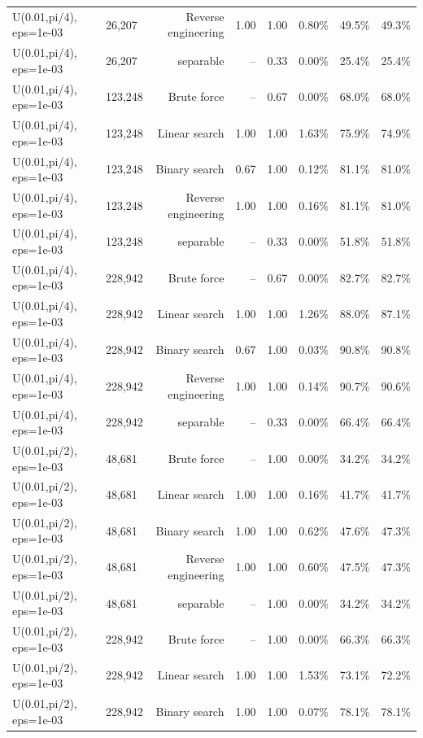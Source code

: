 \begin{tabular}{llrrrrrr}
U(0.01,pi/4), eps=1e-03 & 26,207 & Reverse engineering & 1.00 & 1.00 & 0.80\% & 49.5\% & 49.3\% \\
U(0.01,pi/4), eps=1e-03 & 26,207 & separable & -- & 0.33 & 0.00\% & 25.4\% & 25.4\% \\
U(0.01,pi/4), eps=1e-03 & 123,248 & Brute force & -- & 0.67 & 0.00\% & 68.0\% & 68.0\% \\
U(0.01,pi/4), eps=1e-03 & 123,248 & Linear search & 1.00 & 1.00 & 1.63\% & 75.9\% & 74.9\% \\
U(0.01,pi/4), eps=1e-03 & 123,248 & Binary search & 0.67 & 1.00 & 0.12\% & 81.1\% & 81.0\% \\
U(0.01,pi/4), eps=1e-03 & 123,248 & Reverse engineering & 1.00 & 1.00 & 0.16\% & 81.1\% & 81.0\% \\
U(0.01,pi/4), eps=1e-03 & 123,248 & separable & -- & 0.33 & 0.00\% & 51.8\% & 51.8\% \\
U(0.01,pi/4), eps=1e-03 & 228,942 & Brute force & -- & 0.67 & 0.00\% & 82.7\% & 82.7\% \\
U(0.01,pi/4), eps=1e-03 & 228,942 & Linear search & 1.00 & 1.00 & 1.26\% & 88.0\% & 87.1\% \\
U(0.01,pi/4), eps=1e-03 & 228,942 & Binary search & 0.67 & 1.00 & 0.03\% & 90.8\% & 90.8\% \\
U(0.01,pi/4), eps=1e-03 & 228,942 & Reverse engineering & 1.00 & 1.00 & 0.14\% & 90.7\% & 90.6\% \\
U(0.01,pi/4), eps=1e-03 & 228,942 & separable & -- & 0.33 & 0.00\% & 66.4\% & 66.4\% \\
U(0.01,pi/2), eps=1e-03 & 48,681 & Brute force & -- & 1.00 & 0.00\% & 34.2\% & 34.2\% \\
U(0.01,pi/2), eps=1e-03 & 48,681 & Linear search & 1.00 & 1.00 & 0.16\% & 41.7\% & 41.7\% \\
U(0.01,pi/2), eps=1e-03 & 48,681 & Binary search & 1.00 & 1.00 & 0.62\% & 47.6\% & 47.3\% \\
U(0.01,pi/2), eps=1e-03 & 48,681 & Reverse engineering & 1.00 & 1.00 & 0.60\% & 47.5\% & 47.3\% \\
U(0.01,pi/2), eps=1e-03 & 48,681 & separable & -- & 1.00 & 0.00\% & 34.2\% & 34.2\% \\
U(0.01,pi/2), eps=1e-03 & 228,942 & Brute force & -- & 1.00 & 0.00\% & 66.3\% & 66.3\% \\
U(0.01,pi/2), eps=1e-03 & 228,942 & Linear search & 1.00 & 1.00 & 1.53\% & 73.1\% & 72.2\% \\
U(0.01,pi/2), eps=1e-03 & 228,942 & Binary search & 1.00 & 1.00 & 0.07\% & 78.1\% & 78.1\% \\

\end{tabular}
